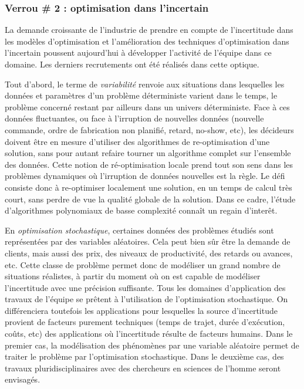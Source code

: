 	
	\subsubsection*{Verrou \# 2 : optimisation dans l'incertain}
	
	
	La demande croissante de l'industrie de prendre en compte de l'incertitude dans les modèles d'optimisation et l'amélioration des techniques d'optimisation dans l'incertain  poussent aujourd'hui à développer l'activité de l'équipe dans ce domaine.  Les derniers recrutements ont été réalisés dans cette optique. 
	
	Tout d'abord, le terme  de \textit{variabilité}  renvoie aux situations dans lesquelles les données et paramètres d'un problème déterministe varient dans le temps, le problème concerné restant par ailleurs dans un univers déterministe. Face à ces données fluctuantes, ou face à l'irruption de nouvelles données (nouvelle commande, ordre de fabrication non planifié, retard, no-show, etc), les décideurs doivent être en mesure d'utiliser des algorithmes de re-optimisation d'une solution, sans pour autant refaire tourner un algorithme complet sur l'ensemble des données. Cette notion de ré-optimisation locale prend tout son sens dans les problèmes dynamiques où l'irruption de données nouvelles est la règle. Le défi consiste donc à re-optimiser localement une solution, en un temps de calcul très court, sans perdre de vue la qualité globale de la solution. Dans ce cadre, l'étude d'algorithmes polynomiaux de basse complexité connaît un regain d'interêt. 
	
	
	En \textit{optimisation stochastique}, certaines données des problèmes étudiés sont représentées par des variables aléatoires. 
	Cela peut bien sûr être la demande de clients, mais aussi des prix, des niveaux de productivité, des retards ou avances, etc. 
	Cette classe de problème permet donc de modéliser un grand nombre de situations réalistes, à partir du moment où on est capable de modéliser l'incertitude avec une précision suffisante. 
	Tous les domaines d'application des travaux de l'équipe se prêtent à l'utilisation de l'optimisation stochastique. On différenciera toutefois les applications pour lesquelles la source d'incertitude provient de facteurs purement techniques (temps de trajet, durée d'exécution, coûts, etc) des applications où l'incertitude résulte de facteurs humains. Dans le premier cas, la modélisation des phénomènes par une variable aléatoire permet de traiter le problème par l'optimisation stochastique. Dans le deuxième cas, des travaux pluridisciplinaires avec des chercheurs en sciences de l'homme seront envisagés. 
	

